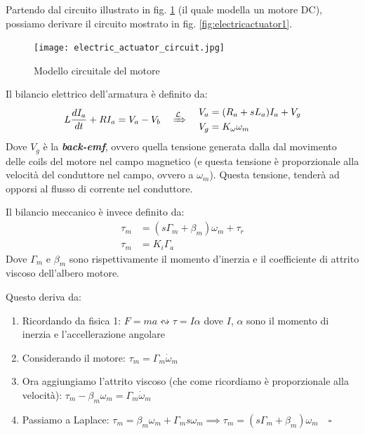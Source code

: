 Partendo dal circuito illustrato in fig. \ref{fig:electricactuatorcircuit} (il quale modella un motore DC), possiamo derivare il circuito mostrato in fig. \ref{fig:electricactuator1}.

\begin{figure}[th!]
	\centering
	\texttt{[image: electric\_actuator\_circuit.jpg]}
	\caption{Modello circuitale del motore}
	\label{fig:electricactuatorcircuit}
\end{figure}

Il bilancio elettrico dell'armatura è definito da:
\begin{align}\label{eq:armature_balance}
L\frac{dI_a}{dt} + RI_a = V_a - V_b
\quad
\xRightarrow{\mathcal {L}}
\quad
\begin{aligned}
V_a &= (R_a + sL_a)I_a + V_g\\
V_g &= K_{\omega} \omega_m
\end{aligned}
\end{align}
Dove $V_g$ è la \textbf{\textit{back-emf}}, ovvero quella tensione generata dalla dal movimento delle coils del motore nel campo magnetico (e questa tensione è proporzionale alla velocità del conduttore nel campo, ovvero a $\omega_m$). Questa tensione, tenderà ad opporsi al flusso di corrente nel conduttore.

Il bilancio meccanico è invece definito da:
\begin{align}
\tau_m &= (s\Gamma_m + \beta_m)\omega_m + \tau_r \\
\tau_m &= K_i\Gamma_a
\end{align}
Dove $\Gamma_m$ e $\beta_m$ sono rispettivamente il momento d'inerzia e il coefficiente di attrito viscoso dell'albero motore.

Questo deriva da:
\begin{enumerate}
	\item Ricordando da fisica 1: $F = ma \leftrightsquigarrow \tau = I\alpha$ dove $I$, $\alpha$ sono il momento di inerzia e l'accellerazione angolare
	\item Considerando il motore: $\tau_m = \Gamma_m\dot{\omega}_m$
	\item Ora aggiungiamo l'attrito viscoso (che come ricordiamo è proporzionale alla velocità): $\tau_m - \beta_m\omega_m = \Gamma_m\dot{\omega}_m$
	\item Passiamo a Laplace: $\tau_m = \beta_m\omega_m + \Gamma_m s\omega_m \implies \tau_m = (s\Gamma_m + \beta_m)\omega_m \quad \square$ 
\end{enumerate}


